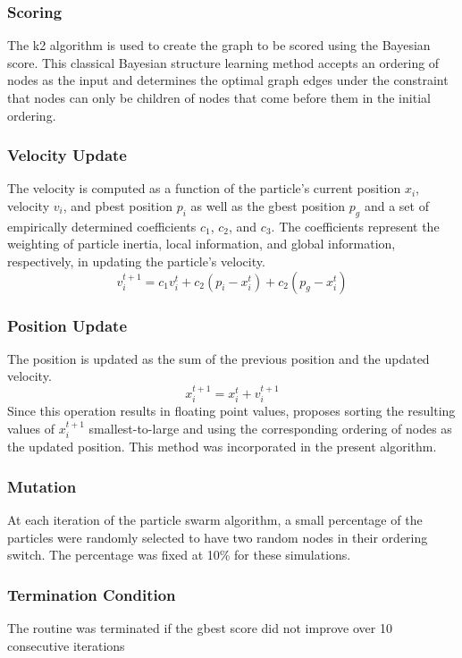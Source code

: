 \documentclass[twoside,11pt]{article}
\begin{document}
\subsubsection{Scoring}
The k2 algorithm is used to create the graph to be scored using the Bayesian score. This classical Bayesian structure learning method accepts an ordering of nodes as the input and determines the optimal graph edges under the constraint that nodes can only be children of nodes that come before them in the initial ordering.
\subsubsection{Velocity Update}
The velocity is computed as a function of the particle's current position $x_i$, velocity $v_i$, and pbest position $p_i$ as well as the gbest position $p_g$ and a set of empirically determined coefficients $c_1$, $c_2$, and $c_3$. The coefficients represent the weighting of particle inertia, local information, and global information, respectively, in updating the particle's velocity.
\begin{equation}
    v^{t+1}_i = c_1 v^t_i + c_2(p_i - x_i^t) + c_2(p_g - x_i^t)
\end{equation}
\subsubsection{Position Update}
The position is updated as the sum of the previous position and the updated velocity.
\begin{equation}
    x^{t+1}_i = x^t_i + v^{t+1}_i
\end{equation}
Since this operation results in floating point values, \cite{paper3} proposes sorting the resulting values of $x^{t+1}_i$ smallest-to-large and using the corresponding ordering of nodes as the updated position. This method was incorporated in the present algorithm.
\subsubsection{Mutation}
At each iteration of the particle swarm algorithm, a small percentage of the particles were randomly selected to have two random nodes in their ordering switch. The percentage was fixed at 10\% for these simulations.
\subsubsection{Termination Condition}
The routine was terminated if the gbest score did not improve over 10 consecutive iterations
\end{document}
